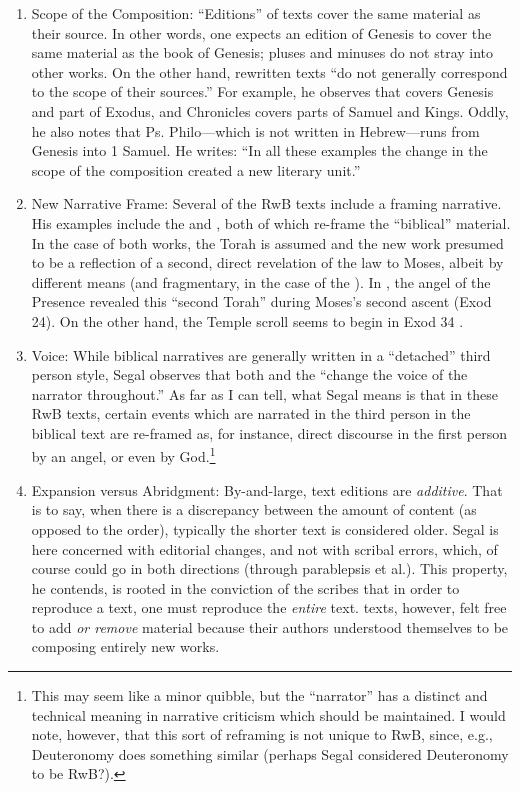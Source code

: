 \begin{enumerate}

    \item Scope of the Composition: ``Editions'' of texts cover the same material as their source. In other words, one expects an edition of Genesis to cover the same material as the book of Genesis; pluses and minuses do not stray into other works. On the other hand, rewritten texts ``do not generally correspond to the scope of their sources.''\autocite[20]{segal_henze2005} For example, he observes that \jub covers Genesis and part of Exodus, and Chronicles covers parts of Samuel and Kings. Oddly, he also notes that Ps. Philo---which is not written in Hebrew---runs from Genesis into 1 Samuel. He writes: ``In all these examples the change in the scope of the composition created a new literary unit.'' \autocite[20--21]{segal_henze2005}
  
    \item New Narrative Frame: Several of the RwB texts include a framing narrative. His examples include the \templescroll and \jub, both of which re-frame the ``biblical'' material. In the case of both works, the Torah is assumed and the new work presumed to be a reflection of a second, direct revelation of the law to Moses, albeit by different means (and fragmentary, in the case of the \templescroll). In \jub, the angel of the Presence revealed this ``second Torah'' during Moses's second ascent (Exod 24). On the other hand, the Temple scroll seems to begin in Exod 34 \autocite[22]{segal_henze2005}.
   
    \item Voice: While biblical narratives are generally written in a ``detached'' third person style, Segal observes that both \jub and the \templescroll ``change the voice of the narrator throughout.'' \autocite[22]{segal_henze2005} As far as I can tell, what Segal means is that in these RwB texts, certain events which are narrated in the third person in the biblical text are re-framed as, for instance, direct discourse in the first person by an angel, or even by God.\footnote{This may seem like a   minor quibble, but the ``narrator'' has a distinct and technical   meaning in narrative criticism which should be maintained. I would   note, however, that this sort of reframing is not unique to RwB,   since, e.g., Deuteronomy does something similar (perhaps Segal   considered Deuteronomy to be RwB?).}
 
    \item Expansion versus Abridgment: By-and-large, text editions are \emph{additive}. That is to say, when there is a discrepancy between the amount of content (as opposed to the order), typically the shorter text is considered older. Segal is here concerned with editorial changes, and not with scribal errors, which, of course could go in both directions (through parablepsis et al.). This property, he contends, is rooted in the conviction of the scribes that in order to reproduce a text, one must reproduce the \emph{entire} text.\autocite[24]{segal_henze2005} \rwb texts, however, felt free to add \emph{or remove} material because their authors understood themselves to be composing entirely new works.\autocite[24]{segal_henze2005} 


\end{enumerate}
